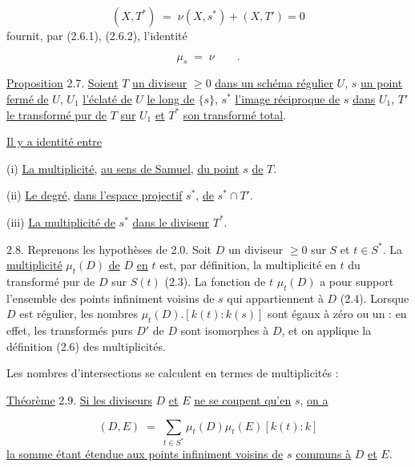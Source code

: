 \begin{equation*}
(X,T^*) \;=\; \nu(X,s^*) + (X,T') = 0
\end{equation*}
fournit, par (2.6.1), (2.6.2), l'identité

\begin{equation}\tag{2.6.3}
\mu_s \;=\; \nu \qquad .
\end{equation}


\underline{Proposition} 2.7. \underline{Soient} $T$ \underline{un diviseur} $\geq 0$ \underline{dans un schéma régulier} $U$, $s$ \underline{un point fermé de} $U$, $U_1$ \underline{l'éclaté de} $U$ \underline{le long de} $\{s\}$, $s^*$ \underline{l'image réciproque de} $s$ \underline{dans} $U_1$, $T'$ \underline{le transformé pur de} $T$ \underline{sur} $U_1$ \underline{et} $T^*$ \underline{son transformé total}.

\underline{Il y a identité entre}

(i) \underline{La multiplicité}, \underline{au sens de Samuel}, \underline{du point} $s$ \underline{de} $T$.

(ii) \underline{Le degré}, \underline{dans l'espace projectif} $s^*$, \underline{de} $s^* \cap T'$.

(iii) \underline{La multiplicité de} $s^*$ \underline{dans le diviseur} $T^*$.

2.8. Reprenons les hypothèses de 2.0. Soit $D$ un diviseur $\geq 0$ sur $S$ et $t \in S^*$. La \underline{multiplicité} $\mu_t(D)$ \underline{de} $D$ \underline{en} $t$ est, par définition, la multiplicité en $t$ du transformé pur de $D$ sur $S(t)$ (2.3). La fonction de $t$ $\mu_t(D)$ a pour support l'ensemble des points infiniment voisins de $s$ qui appartiennent à $D$ (2.4). Lorsque $D$ est régulier, les nombres $\mu_t(D).[k(t) : k(s)]$ sont égaux à zéro ou un : en effet, les transformés purs $D'$ de $D$ sont isomorphes à $D$, et on applique la définition (2.6) des multiplicités.

Les nombres d'intersections se calculent en termes de multiplicités :

\underline{Théorème} 2.9. \underline{Si les diviseurs} $D$ \underline{et} $E$ \underline{ne se coupent qu'en} $s$, \underline{on a}

\begin{equation*}
(D,E) \;=\; \sum_{t \in S^*} \mu_t(D)\mu_t(E)[k(t):k]
\end{equation*}
\underline{la somme étant étendue aux points infiniment voisins de} $s$ \underline{communs à} $D$ \underline{et} $E$.


